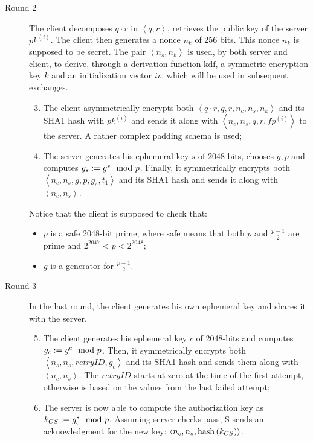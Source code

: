 \begin{description}
  \item[Round 2] The client decomposes $q\cdot r$ in $\left<q, r\right>$, retrieves the public key of the server $pk^{\left(i\right)}$. The client then generates a nonce $n_k$ of 256 bits. This nonce $n_k$ is supposed to be secret. The pair $\left<n_s, n_k\right>$ is used, by both server and client, to derive, through a derivation function $\mbox{kdf}$, a symmetric encryption key $k$ and an initialization vector $iv$, which will be used in subsequent exchanges.
    \begin{enumerate}
      \setcounter{enumi}{2}
      \item{The client asymmetrically encrypts both $\left<q\cdot r, q, r, n_c, n_s, n_k\right>$ and its SHA1 hash with $pk^{(i)}$ and sends it along with $\left<n_c, n_s, q, r, fp^{(i)}\right>$ to the server. A rather complex padding schema is used;}
      \item{The server generates his \DiHe{} ephemeral key $s$ of 2048-bits, chooses $g, p$ and computes $g_s:= g^s \mod{p}$. Finally, it symmetrically encrypts both $\left<n_c, n_s, g, p, g_s, t_1\right>$ and its SHA1 hash and sends it along with $\left<n_c, n_s\right>$.}
    \end{enumerate}

    Notice that the client is supposed to check that:
    \begin{itemize}
      \label{item:DH-clients-checks}
      \item{$p$ is a safe 2048-bit prime, where safe means that both $p$ and $\frac{p-1}{2}$ are prime and $2^{2047} < p < 2^{2048}$;}
      \item{$g$ is a generator for $\frac{p-1}{2}$.}
    \end{itemize}

  \item[Round 3] In the last round, the client generates his own \DiHe{} ephemeral key and shares it with the server.
    \begin{enumerate}
      \setcounter{enumi}{4}
      \item{The client generates his ephemeral key $c$ of 2048-bits and computes $g_c:= g^c \mod{p}$. Then, it symmetrically encrypts both $\left<n_s, n_s, retryID, g_c\right>$ and its SHA1 hash and sends them along with $\left<n_c, n_s\right>$. The $retryID$ starts at zero at the time of the first attempt, otherwise is based on the values from the last failed attempt;}
      \item{The server is now able to compute the authorization key as $k_{CS}:= g_c^s \mod{p}$. Assuming server checks pass, S sends an acknowledgment for the new key: $\left<n_c, n_s, \mbox{hash}\left(k_{CS}\right)\right>$.}
    \end{enumerate}

\end{description}


